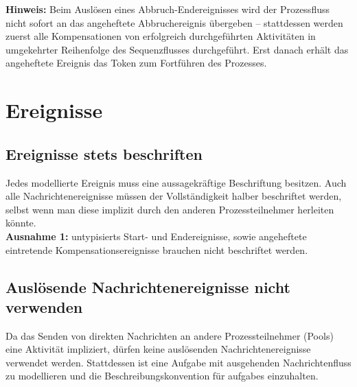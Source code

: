 \documentclass[12pt,report]{snetTeaching}
\begin{document}
\begin{Rahmen}
	\hfill
\end{Rahmen}

\textbf{Hinweis:} Beim Auslösen eines Abbruch-Endereignisses wird der Prozessfluss nicht sofort an das angeheftete Abbruchereignis übergeben -- stattdessen werden zuerst alle Kompensationen von erfolgreich durchgeführten Aktivitäten in umgekehrter Reihenfolge des Sequenzflusses durchgeführt. Erst danach erhält das angeheftete Ereignis das Token zum Fortführen des Prozesses.








\clearpage
\section{Ereignisse}

\subsection{Ereignisse stets beschriften}

Jedes modellierte Ereignis muss eine aussagekräftige Beschriftung besitzen. Auch alle Nachrichtenereignisse müssen der Vollständigkeit halber beschriftet werden, selbst wenn man diese implizit durch den anderen Prozessteilnehmer herleiten könnte.\\
\textbf{Ausnahme 1:} \glspl{untypisiert} Start- und Endereignisse, sowie angeheftete eintretende Kompensationsereignisse brauchen nicht beschriftet werden.\\ 



\begin{Rahmen}
	\hfill
\end{Rahmen}


\subsection{Auslösende Nachrichtenereignisse nicht verwenden}

Da das Senden von direkten Nachrichten an andere Prozessteilnehmer (Pools) eine Aktivität impliziert, dürfen keine auslösenden Nachrichtenereignisse verwendet werden. Stattdessen ist eine Aufgabe mit ausgehenden Nachrichtenfluss zu modellieren und die Beschreibungskonvention für \glspl{aufgabe} einzuhalten.  
\end{document}
